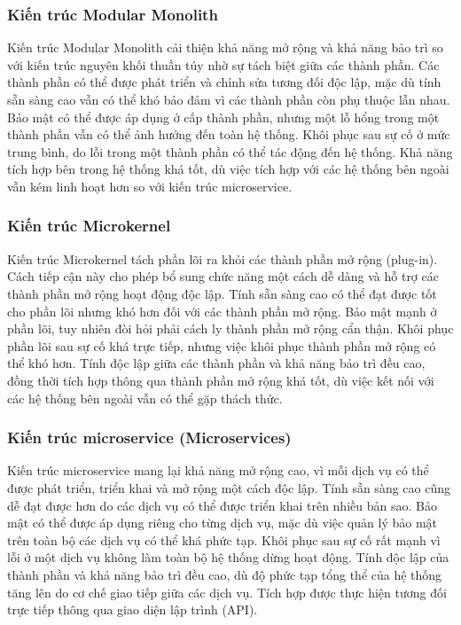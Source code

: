 \subsubsection{Kiến trúc Modular Monolith}
Kiến trúc Modular Monolith cải thiện khả năng mở rộng và khả năng bảo trì so với kiến trúc nguyên khối thuần túy nhờ sự tách biệt giữa các thành phần. Các thành phần có thể được phát triển và chỉnh sửa tương đối độc lập, mặc dù tính sẵn sàng cao vẫn có thể khó bảo đảm vì các thành phần còn phụ thuộc lẫn nhau. Bảo mật có thể được áp dụng ở cấp thành phần, nhưng một lỗ hổng trong một thành phần vẫn có thể ảnh hưởng đến toàn hệ thống. Khôi phục sau sự cố ở mức trung bình, do lỗi trong một thành phần có thể tác động đến hệ thống. Khả năng tích hợp bên trong hệ thống khá tốt, dù việc tích hợp với các hệ thống bên ngoài vẫn kém linh hoạt hơn so với kiến trúc microservice.

\subsubsection{Kiến trúc Microkernel}
Kiến trúc Microkernel tách phần lõi ra khỏi các thành phần mở rộng (plug-in). Cách tiếp cận này cho phép bổ sung chức năng một cách dễ dàng và hỗ trợ các thành phần mở rộng hoạt động độc lập. Tính sẵn sàng cao có thể đạt được tốt cho phần lõi nhưng khó hơn đối với các thành phần mở rộng. Bảo mật mạnh ở phần lõi, tuy nhiên đòi hỏi phải cách ly thành phần mở rộng cẩn thận. Khôi phục phần lõi sau sự cố khá trực tiếp, nhưng việc khôi phục thành phần mở rộng có thể khó hơn. Tính độc lập giữa các thành phần và khả năng bảo trì đều cao, đồng thời tích hợp thông qua thành phần mở rộng khá tốt, dù việc kết nối với các hệ thống bên ngoài vẫn có thể gặp thách thức.

\subsubsection{Kiến trúc microservice (Microservices)}
Kiến trúc microservice mang lại khả năng mở rộng cao, vì mỗi dịch vụ có thể được phát triển, triển khai và mở rộng một cách độc lập. Tính sẵn sàng cao cũng dễ đạt được hơn do các dịch vụ có thể được triển khai trên nhiều bản sao. Bảo mật có thể được áp dụng riêng cho từng dịch vụ, mặc dù việc quản lý bảo mật trên toàn bộ các dịch vụ có thể khá phức tạp. Khôi phục sau sự cố rất mạnh vì lỗi ở một dịch vụ không làm toàn bộ hệ thống dừng hoạt động. Tính độc lập của thành phần và khả năng bảo trì đều cao, dù độ phức tạp tổng thể của hệ thống tăng lên do cơ chế giao tiếp giữa các dịch vụ. Tích hợp được thực hiện tương đối trực tiếp thông qua giao diện lập trình (API).

